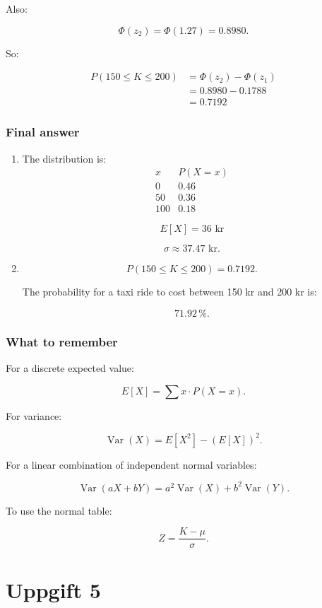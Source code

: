 \documentclass[10pt]{article}
\begin{document}
Also:

\[
\Phi(z_2)=\Phi(1.27)=0.8980.
\]

So:

\begin{align*}
P(150\leq K\leq 200)
&=
\Phi(z_2)-\Phi(z_1) \\[2mm]
&=
0.8980-0.1788 \\[2mm]
&=0.7192
\end{align*}

\subsubsection*{Final answer}
\begin{enumerate}[label=\alph*)]
\item The distribution is:
\[
\begin{array}{c|c}
x & P(X=x)\\
\hline
0 & 0.46\\
50 & 0.36\\
100 & 0.18
\end{array}
\]

\[
E[X]=36\text{ kr}
\]

\[
\sigma\approx 37.47\text{ kr}.
\]

\item
\[
P(150\leq K\leq 200)
=0.7192.
\]

The probability for a taxi ride to cost between
150 kr and 200 kr is:

\[
71.92\,\%.
\]
\end{enumerate}

\subsubsection*{What to remember}
For a discrete expected value:

\[
E[X]=
\sum x\cdot P(X=x).
\]

For variance:

\[
\operatorname{Var}(X)
=E[X^2]-(E[X])^2.
\]

For a linear combination of independent normal variables:

\[
\operatorname{Var}(aX+bY)
=a^2\operatorname{Var}(X)
+b^2\operatorname{Var}(Y).
\]

To use the normal table:

\[
Z=\frac{K-\mu}{\sigma}.
\]

\section*{Uppgift 5}
\end{document}
